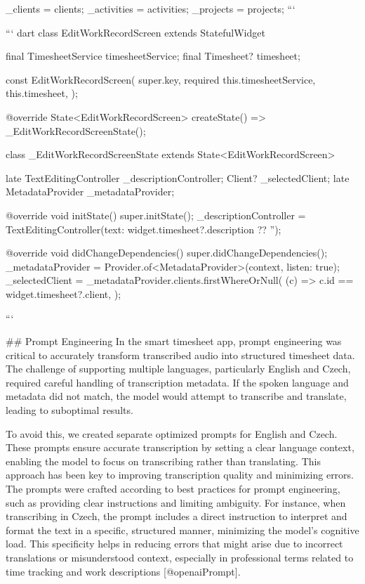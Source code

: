 \documentclass[
  digital,     %
  oneside,     %
  nosansbold,  %
  nocolorbold, %
  lof,         %
  lot,         %
]{fithesis4}
\begin{document}
\begin{markdown}
{{{      _clients = clients;
      _activities = activities;
      _projects = projects;
    }
  }
}
```

``` dart
class EditWorkRecordScreen extends StatefulWidget {
  final TimesheetService timesheetService;
  final Timesheet? timesheet;

  const EditWorkRecordScreen({
    super.key,
    required this.timesheetService,
    this.timesheet,
  });

  @override
  State<EditWorkRecordScreen> createState() => _EditWorkRecordScreenState();
}

class _EditWorkRecordScreenState extends State<EditWorkRecordScreen> {
  late TextEditingController _descriptionController;
  Client? _selectedClient;
  late MetadataProvider _metadataProvider;

  @override
  void initState() {
    super.initState();
    _descriptionController =
        TextEditingController(text: widget.timesheet?.description ?? '');
  }

  @override
  void didChangeDependencies() {
    super.didChangeDependencies();
    _metadataProvider = Provider.of<MetadataProvider>(context, listen: true);
    _selectedClient = _metadataProvider.clients.firstWhereOrNull(
      (c) => c.id == widget.timesheet?.client,
    );
  }
}
```

## Prompt Engineering
In the smart timesheet app, prompt engineering was critical to accurately transform transcribed audio into structured timesheet data. The challenge of supporting multiple languages, particularly English and Czech, required careful handling of transcription metadata. If the spoken language and metadata did not match, the model would attempt to transcribe and translate, leading to suboptimal results.

To avoid this, we created separate optimized prompts for English and Czech. These prompts ensure accurate transcription by setting a clear language context, enabling the model to focus on transcribing rather than translating. This approach has been key to improving transcription quality and minimizing errors. The prompts were crafted according to best practices for prompt engineering, such as providing clear instructions and limiting ambiguity. For instance, when transcribing in Czech, the prompt includes a direct instruction to interpret and format the text in a specific, structured manner, minimizing the model’s cognitive load. This specificity helps in reducing errors that might arise due to incorrect translations or misunderstood context, especially in professional terms related to time tracking and work descriptions [@openaiPrompt].


\end{markdown}
\end{document}
